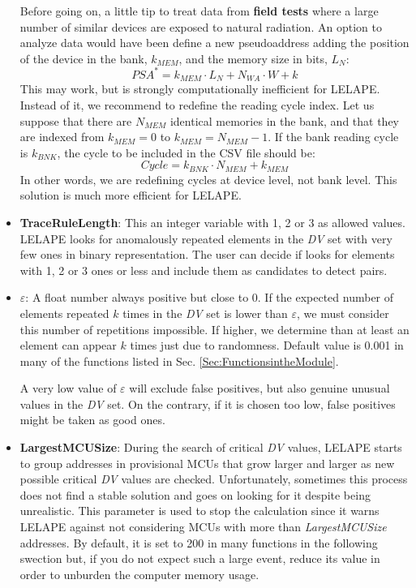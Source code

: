 \begin{itemize}
	Before going on, a little tip to treat data from\textbf{ field tests} where a large number of similar devices are exposed to natural radiation. An option to analyze data would have been define a new pseudoaddress adding the position of the device in the bank, \(k_{MEM}\), and the memory size in bits, \(L_N\):
	\[
		PSA^* = k_{MEM}\cdot L_N + N_{WA} \cdot W + k
	\]
	This may work, but is strongly computationally inefficient for LELAPE. Instead of it, we recommend to redefine the reading cycle index. Let us suppose that there are \(N_{MEM}\) identical memories in the bank, and that they are indexed from \(k_{MEM}=0\) to \(k_{MEM}=N_{MEM}-1\). If the bank reading cycle is \(k_{BNK}\), the cycle to be included in the CSV file should be:
	\begin{equation}
		Cycle = k_{BNK}\cdot N_{MEM}+k_{MEM}
	\end{equation}
	In other words, we are redefining cycles at device level, not bank level. This solution is much more efficient for LELAPE.
	\item \textbf{TraceRuleLength}: This an integer variable with 1, 2 or 3 as allowed values. LELAPE looks for anomalously repeated elements in the \textit{DV} set with very few ones in binary representation. The user can decide if looks for elements with 1, 2 or 3 ones or less and include them as candidates to detect pairs. 
	\item \textbf{$\varepsilon$}: A float number always positive but close to 0. If the expected number of elements repeated $k$ times in the \textit{DV} set is lower than $\varepsilon$, we must consider this number of repetitions impossible. If higher, we determine than at least an element can appear $k$ times just due to randomness. Default value is 0.001 in many of the functions listed in Sec. \ref{Sec:FunctionsintheModule}.
	
	A very low value of $\varepsilon$ will exclude false positives, but also genuine unusual values in the \textit{DV} set. On the contrary, if it is chosen too low, false positives might be taken as good ones.
	\item \textbf{LargestMCUSize}: During the search of critical \textit{DV} values, LELAPE starts to group addresses in provisional MCUs that grow larger and larger as new possible critical \textit{DV} values are checked. Unfortunately, sometimes this process does not find a stable solution and goes on looking for it despite being unrealistic. This parameter is used to stop the calculation since it warns LELAPE against not considering MCUs with more than \textit{LargestMCUSize} addresses. By default, it is set to 200 in many functions in the following swection but, if you do not expect such a large event, reduce its value in order to unburden the computer memory usage. 
\end{itemize}

